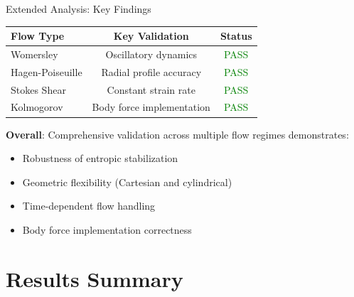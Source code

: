 \documentclass[aspectratio=169]{beamer}
\begin{document}
\begin{frame}{Extended Analysis: Key Findings}
\begin{table}
\centering
\small
\begin{tabular}{lcc}
\toprule
\textbf{Flow Type} & \textbf{Key Validation} & \textbf{Status} \\
\midrule
Womersley & Oscillatory dynamics & \textcolor{green}{PASS} \\
Hagen-Poiseuille & Radial profile accuracy & \textcolor{green}{PASS} \\
Stokes Shear & Constant strain rate & \textcolor{green}{PASS} \\
Kolmogorov & Body force implementation & \textcolor{green}{PASS} \\
\bottomrule
\end{tabular}
\end{table}

\vspace{0.3cm}
\textbf{Overall}: Comprehensive validation across multiple flow regimes demonstrates:
\begin{itemize}
    \item Robustness of entropic stabilization
    \item Geometric flexibility (Cartesian and cylindrical)
    \item Time-dependent flow handling
    \item Body force implementation correctness
\end{itemize}
\end{frame}

\section{Results Summary}
\end{document}
